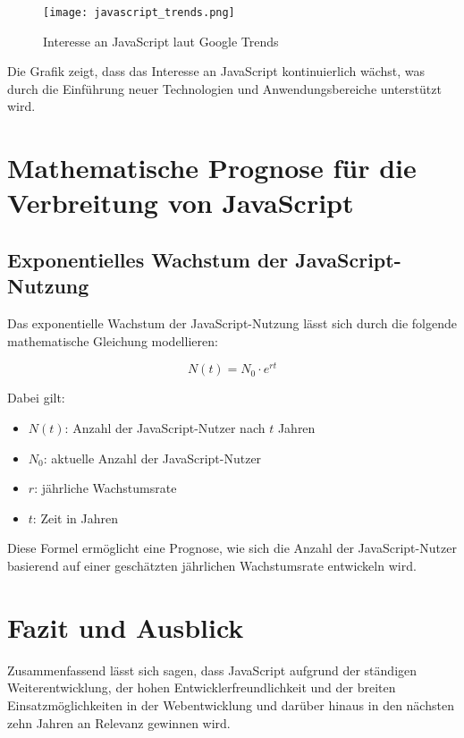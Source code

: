 \documentclass[a4paper,12pt]{article}
\begin{document}
\begin{figure}[h]
    \centering
    \texttt{[image: javascript\_trends.png]} 
    \caption{Interesse an JavaScript laut Google Trends}
    \label{fig:trends}
\end{figure}

Die Grafik zeigt, dass das Interesse an JavaScript kontinuierlich wächst, was durch die Einführung neuer Technologien und Anwendungsbereiche unterstützt wird.

\section{Mathematische Prognose für die Verbreitung von JavaScript}
\subsection{Exponentielles Wachstum der JavaScript-Nutzung}
Das exponentielle Wachstum der JavaScript-Nutzung lässt sich durch die folgende mathematische Gleichung modellieren:

\begin{equation}
    N(t) = N_0 \cdot e^{rt}
\end{equation}

Dabei gilt:
\begin{itemize}
    \item \( N(t) \): Anzahl der JavaScript-Nutzer nach \( t \) Jahren
    \item \( N_0 \): aktuelle Anzahl der JavaScript-Nutzer
    \item \( r \): jährliche Wachstumsrate
    \item \( t \): Zeit in Jahren
\end{itemize}

Diese Formel ermöglicht eine Prognose, wie sich die Anzahl der JavaScript-Nutzer basierend auf einer geschätzten jährlichen Wachstumsrate entwickeln wird.

\section{Fazit und Ausblick}
Zusammenfassend lässt sich sagen, dass JavaScript aufgrund der ständigen Weiterentwicklung, der hohen Entwicklerfreundlichkeit und der breiten Einsatzmöglichkeiten in der Webentwicklung und darüber hinaus in den nächsten zehn Jahren an Relevanz gewinnen wird.

\newpage
\end{document}
